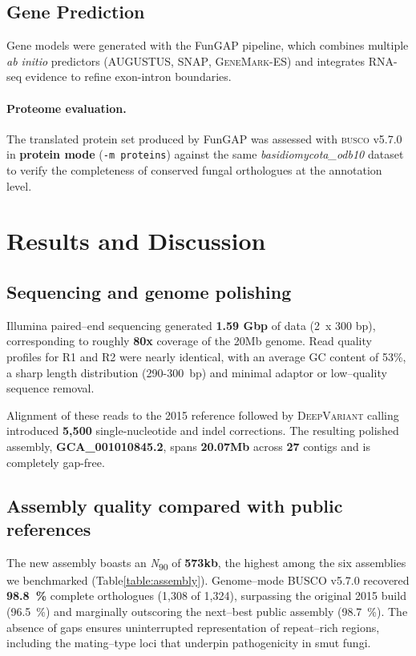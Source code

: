 \documentclass[Journal,letterpaper]{ascelike-new}
\begin{document}
\subsection*{Gene Prediction}

Gene models were generated with the FunGAP pipeline, which combines multiple \textit{ab initio} predictors (\textsc{AUGUSTUS}, \textsc{SNAP}, \textsc{GeneMark-ES}) and integrates RNA-seq evidence to refine exon-intron boundaries.

\paragraph{Proteome evaluation.} The translated protein set produced by FunGAP was assessed with \textsc{busco} v5.7.0 in \textbf{protein mode} (\texttt{-m proteins}) against the same \textit{basidiomycota\_odb10} dataset to verify the completeness of conserved fungal orthologues at the annotation level.

 \section*{Results and Discussion}

 \subsection*{Sequencing and genome polishing}

Illumina paired--end sequencing generated \textbf{1.59 Gbp} of data (2~x 300 bp), corresponding to roughly \textbf{80x} coverage of the 20Mb genome. Read quality profiles for R1 and R2 were nearly identical, with an average GC content of 53\%, a sharp length distribution (290-300~bp) and minimal adaptor or low--quality sequence removal.

Alignment of these reads to the 2015 reference followed by \textsc{DeepVariant} calling introduced \textbf{5,500} single-nucleotide and indel corrections. The resulting polished assembly, \textbf{GCA\_001010845.2}, spans \textbf{20.07Mb} across \textbf{27} contigs and is completely gap-free.

\subsection*{Assembly quality compared with public references}

The new assembly boasts an \textit{N}\textsubscript{90} of \textbf{573kb}, the highest among the six assemblies we benchmarked (Table\ref{table:assembly}). Genome--mode BUSCO v5.7.0 recovered \textbf{98.8~\%} complete orthologues (1,308 of 1,324), surpassing the original 2015 build (96.5~\%) and marginally outscoring the next--best public assembly (98.7~\%). The absence of gaps ensures uninterrupted representation of repeat--rich regions, including the mating--type loci that underpin pathogenicity in smut fungi.
\end{document}
